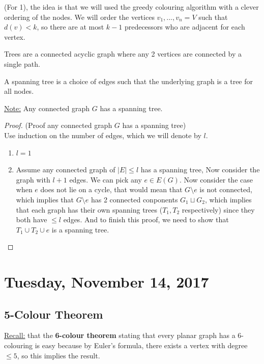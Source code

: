 \documentclass[12pt]{article}
\begin{document}
(For 1), the idea is that we will used the greedy colouring algorithm with a clever ordering of the nodes. We will order the vertices $v_1, ... , v_n = V$ such that $d(v) < k$, so there are at most $k-1$ predecessors who are adjacent for each vertex.\\

\begin{tcolorbox}[title=Definition:Trees]
	Trees are a connected acyclic graph where any 2 vertices are connected by a single path.
\end{tcolorbox}

\begin{tcolorbox}[title=Definition: Spanning Tree]
	A spanning tree is a choice of edges such that the underlying graph is a tree for all nodes.
\end{tcolorbox}

\underline{Note:} Any connected graph $G$ has a spanning tree.

\begin{proof}
	(Proof any connected graph $G$ has a spanning tree)\\
	Use induction on the number of edges, which we will denote by $l$.
	\begin{enumerate}
		\item{$l=1$}
		\item{Assume any connected graph of  $|E|\leq l$  has a spanning tree, Now consider the graph with $l+1$ edges. We can pick any $e\in E(G)$. Now consider the case when $e$ does not lie on a cycle, that would mean that $G \setminus e$ is not connected, which implies that $G \setminus e$ has 2 connected conponents $G_1 \sqcup G_2$, which implies that each graph has their own spanning trees ($T_1, T_2$ respectively) since they both have  $\leq l$ edges. And to finish this proof, we need to show that $T_1 \cup T_2 \cup e $ is a spanning tree.}
	\end{enumerate}
\end{proof}

\newpage

\section{Tuesday, November 14, 2017}

\subsection{5-Colour Theorem}

\begin{tcolorbox}
	\underline{Recall:} that the \textbf{6-colour theorem} stating that every planar graph has a 6-colouring is easy because by Euler's formula, there exists a vertex with degree $\leq 5$, so this implies the result.
\end{tcolorbox}
\end{document}
